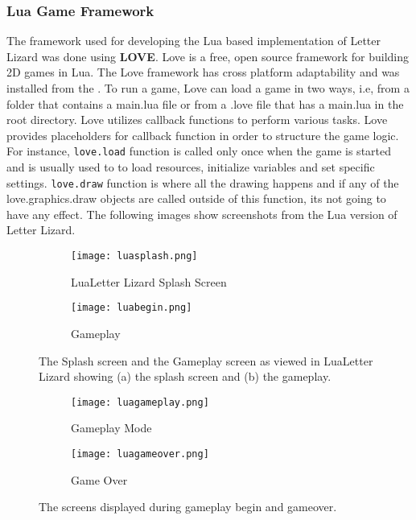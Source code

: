 \subsubsection{Lua Game Framework}
The framework used for developing the Lua based implementation of Letter Lizard was done using \textbf{LOVE}. Love is a free, open source framework for building 2D games in Lua. The Love framework has cross platform adaptability and was installed from the \cite{love}. To run a game, Love can load a game in two ways, i.e, from a folder that contains a main.lua file or from a .love file that has a main.lua in the root directory. Love utilizes callback functions to perform various tasks. Love provides placeholders for callback function in order to structure the game logic. For instance, \texttt{love.load} function is called only once when the game is started and is usually used to to load resources, initialize variables and set specific settings. \texttt{love.draw} function is where all the drawing happens and if any of the love.graphics.draw objects are called outside of this function, its not going to have any effect. The following images show screenshots from the Lua version of Letter Lizard.


\begin{figure}
    \centering
    \begin{subfigure}{0.49\textwidth}
        \texttt{[image: luasplash.png]}
        \caption{LuaLetter Lizard Splash Screen}
        \label{luasplash}
    \end{subfigure}
    \begin{subfigure}{0.49\textwidth}
        \texttt{[image: luabegin.png]}
        \caption{Gameplay}
        \label{luabegin}
    \end{subfigure}
    \caption{The Splash screen and the Gameplay screen as viewed in LuaLetter Lizard
    showing (a) the splash screen and (b) the gameplay.}
    \label{luascreenshots1}
\end{figure}

\begin{figure}
    \centering
    \begin{subfigure}{0.49\textwidth}
        \texttt{[image: luagameplay.png]}
        \caption{Gameplay Mode}
        \label{luagameplay}
    \end{subfigure}
    \begin{subfigure}{0.49\textwidth}
        \texttt{[image: luagameover.png]}
        \caption{Game Over}
        \label{luagameover}
    \end{subfigure}
    \caption{The screens displayed during gameplay begin and gameover.}
    \label{luascreenshots2}
\end{figure}



